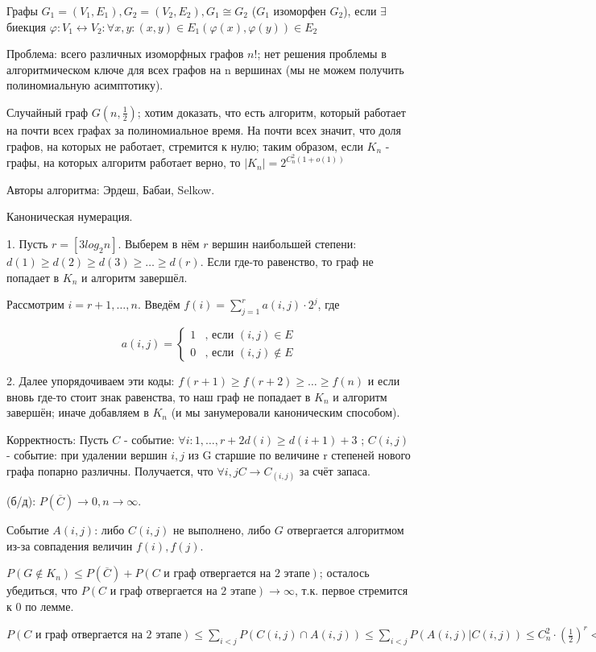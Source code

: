 \Def Графы $G_1 = (V_1, E_1), G_2 = (V_2, E_2), G_1 \cong G_2$ ($G_1$ изоморфен $G_2$), если $\exists$ биекция $\varphi: V_1 \leftrightarrow V_2: \forall x, y: (x, y) \in E_1  (\varphi(x), \varphi(y)) \in E_2$

Проблема: всего различных изоморфных графов $n!$; нет решения проблемы в алгоритмическом ключе для всех графов на n вершинах (мы не можем получить полиномиальную асимптотику). 

Случайный граф $G(n, \frac{1}{2})$; хотим доказать, что есть алгоритм, который работает на почти всех графах за полиномиальное время. На почти всех значит, что доля графов, на которых не работает, стремится к нулю; таким образом, если $K_n$ - графы, на которых алгоритм работает верно, то $|K_n| = 2^{C_n^2(1 + o(1))}$

Авторы алгоритма: Эрдеш, Бабаи, Selkow. 

Каноническая нумерация.

1. Пусть $r = [3log_2n]$. Выберем в нём $r$ вершин наибольшей степени: $d(1) \geqslant d(2) \geqslant d(3) \geqslant \dots \geqslant d(r)$. Если где-то равенство, то граф не попадает в $K_n$ и алгоритм завершёл.

Рассмотрим $i = r+1, \dots , n$. Введём $f(i) = \sum_{j=1}^{r} a(i, j) \cdot 2^j$, где 

\begin{equation*}
a(i, j) = 
 \begin{cases}
   1 &\text{, если $(i, j) \in E$}\\
   0 &\text{, если $(i, j) \notin E$}
 \end{cases}
\end{equation*}

2. Далее упорядочиваем эти коды: $f(r + 1) \geqslant f(r+2) \geqslant \dots \geqslant f(n)$ и если вновь где-то стоит знак равенства, то наш граф не попадает в $K_n$ и алгоритм завершён; иначе добавляем в $K_n$ (и мы занумеровали каноническим способом).

Корректность: \Proof Пусть $C$ - событие: $\forall i: 1, \dots, r+2 d(i) \geqslant d(i+1) + 3 $ ; $C(i, j)$ - событие: при удалении вершин $i, j$ из G старшие по величине r степеней нового графа попарно различны. Получается, что $\forall i, j C \to C_(i, j)$ за счёт запаса.

\Lemma (б/д): $P(\overline{C}) \to 0, n \to \infty$. 

Событие $A(i, j)$: либо $C(i,j)$ не выполнено, либо $G$ отвергается алгоритмом из-за совпадения величин $f(i), f(j)$.

$P(G \notin K_n) \leqslant P(\overline{C}) + P(C \text{ и граф отвергается на 2 этапе})$; осталось убедиться, что $P(C \text{ и граф отвергается на 2 этапе}) \to \infty$, т.к. первое стремится к 0 по лемме. 

$P(C \text{ и граф отвергается на 2 этапе}) \leqslant \sum_{i < j} P(C(i, j) \cap A(i, j))\leqslant \sum_{i < j} P(A(i, j) | C(i, j)) \leqslant C_n^2 \cdot 
(\frac{1}{2})^r < n^2 2^{-3log_2n} = \frac{1}{n} \to 0$ \EndProof